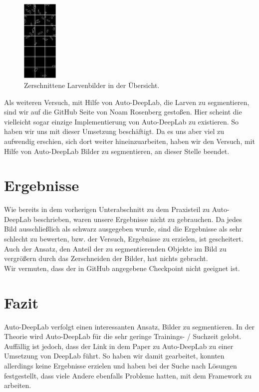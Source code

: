 \begin{figure}[H]
	\centering
	\includegraphics[width=0.15\textwidth]{Pictures/AutoDeepLab/ZerschnittBoxen-Beispiel.png}
	\caption{Zerschnittene Larvenbilder in der Übersicht.}
	\label{pic:zerschnitteneLarven}
\end{figure}

Als weiteren Versuch, mit Hilfe von Auto-DeepLab, die Larven zu segmentieren, sind wir auf die GitHub Seite von Noam Rosenberg \cite{deeplabRosenberg} gestoßen. Hier scheint die vielleicht sogar einzige Implementierung von Auto-DeepLab zu existieren. So haben wir uns mit dieser Umsetzung beschäftigt. Da es uns aber viel zu aufwendig erschien, sich dort weiter hineinzuarbeiten, haben wir den Versuch, mit Hilfe von Auto-DeepLab Bilder zu segmentieren, an dieser Stelle beendet.

\section{Ergebnisse}

Wie bereits in dem vorherigen Unterabschnitt zu dem Praxisteil zu Auto-DeepLab beschrieben, waren unsere Ergebnisse nicht zu gebrauchen. Da jedes Bild ausschließlich als schwarz ausgegeben wurde, sind die Ergebnisse als sehr schlecht zu bewerten, bzw. der Versuch, Ergebnisse zu erzielen, ist gescheitert. Auch der Ansatz, den Anteil der zu segmentierenden Objekte im Bild zu vergrößern durch das Zerschneiden der Bilder, hat nichts gebracht.\\
Wir vermuten, dass der in GitHub angegebene Checkpoint nicht geeignet ist.

\section{Fazit}

Auto-DeepLab verfolgt einen interessanten Ansatz, Bilder zu segmentieren. In der Theorie wird Auto-DeepLab für die sehr geringe Trainings- / Suchzeit gelobt. Auffällig ist jedoch, dass der Link in dem Paper zu Auto-DeepLab \cite{autodeeplabPaper} zu einer Umsetzung von DeepLab \cite{deeplabGithub} führt.  So haben wir damit gearbeitet, konnten allerdings keine Ergebnisse erzielen und haben bei der Suche nach Lösungen festgestellt, dass viele Andere ebenfalls Probleme hatten, mit dem Framework zu arbeiten.

